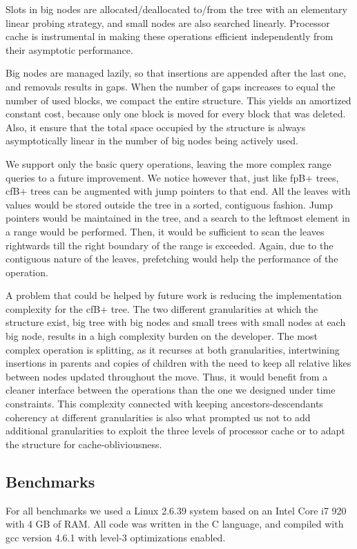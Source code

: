 \documentclass{article}
\begin{document}
Slots in big nodes are allocated/deallocated to/from the tree with an elementary
linear probing strategy,
and small nodes are also searched linearly.
Processor cache is instrumental in making these operations efficient
independently from their asymptotic performance.

Big nodes are managed lazily, so that insertions are appended after the last
one, and removals results in gaps.
When the number of gaps increases to equal the number of used blocks, we compact
the entire structure.
This yields an amortized constant cost, because only one block is moved for
every block that was deleted.
Also, it ensure that the total space occupied by the structure is always
asymptotically linear in the number
of big nodes being actively used.

We support only the basic query operations, leaving the more complex range
queries to a future improvement.
We notice however that, just like fpB+ trees, cfB+ trees can be augmented with
jump pointers to that end.
All the leaves with values would be stored outside the tree in a sorted,
contiguous fashion.
Jump pointers would be maintained in the tree, and a search to the leftmost
element in a range would be performed.
Then, it would be sufficient to scan the leaves rightwards till the right
boundary of the range is exceeded.
Again, due to the contiguous nature of the leaves, prefetching would help the
performance of the operation.

A problem that could be helped by future work is reducing the implementation
complexity for the cfB+ tree.
The two different granularities at which the structure exist, big tree with big
nodes and small trees with small nodes
at each big node, results in a high complexity burden on the developer.
The most complex operation is splitting, as it recurses at both granularities,
intertwining insertions in parents
and copies of children with the need to keep all relative likes between nodes
updated throughout the move.
Thus, it would benefit from a cleaner interface between the operations than the
one we designed under
time constraints. 
This complexity connected with keeping ancestors-descendants coherency at
different granularities
is also what prompted us not to add additional granularities to exploit the
three levels of processor cache
or to adapt the structure for cache-obliviousness.


\subsection{Benchmarks}
For all benchmarks we used a Linux 2.6.39 system based on an Intel Core i7 920
with 4 GB of RAM.
All code was written in the C language, and compiled with gcc version 4.6.1 with
level-3 optimizations enabled.
\end{document}
